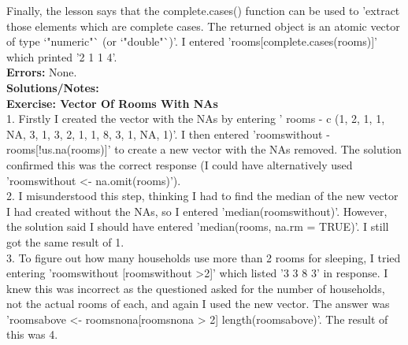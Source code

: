 \documentclass{article}
\begin{document}
\begin{FlushLeft}
Finally, the lesson says that the complete.cases() function can be used to 'extract those elements which are complete cases. The returned object is an atomic vector of type `"numeric"` (or `"double"`)'. I entered 'rooms[complete.cases(rooms)]' which printed '2 1 1 4'. \\
\textbf{Errors:} None.\\
\textbf{Solutions/Notes:}\\
\vspace{5mm}
\textbf{Exercise: Vector Of Rooms With NAs}\\ 
1. Firstly I created the vector with the NAs by entering ' rooms \lessthan - c (1, 2, 1, 1, NA, 3, 1, 3, 2, 1, 1, 8, 3, 1, NA, 1)'. I then entered 'rooms\textunderscore without \lessthan - rooms[!us.na(rooms)]' to create a new vector with the NAs removed. The solution confirmed this was the correct response (I could have alternatively used 'rooms\textunderscore without \textless - na.omit(rooms)').\\
2. I misunderstood this step, thinking I had to find the median of the new vector I had created without the NAs, so I entered 'median(rooms\textunderscore without)'. However, the solution said I should have entered 'median(rooms, na.rm = TRUE)'. I still got the same result of 1.\\
3. To figure out how many households use more than 2 rooms for sleeping, I tried entering 'rooms\textunderscore without [rooms\textunderscore without \textgreater 2]' which listed '3 3 8 3' in response. I knew this was incorrect as the questioned asked for the number of households, not the actual rooms of each, and again I used the new vector. The answer was 'rooms\textunderscore above \textless - rooms\textu no\textunderscore na[rooms\textunderscore no\textunderscore na \textgreater{} 2]
length(rooms\textunderscore above)'. The result of this was 4.\\


\end{FlushLeft}
\end{document}
